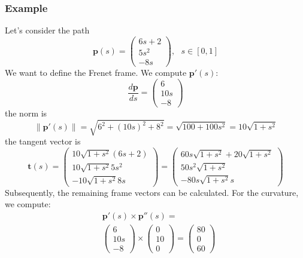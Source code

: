 \documentclass[10pt, letterpaper]{report}
\begin{document}
\subsubsection{Example}
Let's consider the path \begin{equation}
    \mathbf p(s)=\begin{pmatrix}
        6s+2\\5s^2\\-8s 
    \end{pmatrix}, \ \ \ s\in [0,1]
\end{equation}
We want to define the Frenet frame. We compute $\mathbf p'(s)$:\begin{equation}
    \frac{d\mathbf p}{ds}=\begin{pmatrix}
        6\\10s\\-8 
    \end{pmatrix}
\end{equation}
the norm is\begin{equation}
    \|\mathbf p'(s)\|=\sqrt{6^2+(10s)^2+8^2}=\sqrt{100+100s^2}=10\sqrt{1+s^2}
\end{equation}
the tangent vector is \begin{equation}
    \mathbf t(s)=\begin{pmatrix}
        10\sqrt{1+s^2}(6s+2)\\10\sqrt{1+s^2}5s^2\\-10\sqrt{1+s^2}8s 
    \end{pmatrix}=\begin{pmatrix}
        60s\sqrt{1+s^2}+20\sqrt{1+s^2}\\50s^2\sqrt{1+s^2}\\-80s\sqrt{1+s^2}s
    \end{pmatrix}
\end{equation}
Subsequently, the remaining frame vectors can be calculated. For the curvature, we compute:\begin{align}
    &\mathbf p'(s)\times \mathbf p''(s)=\\ 
    &\begin{pmatrix}
        6\\10s\\-8 
    \end{pmatrix}\times \begin{pmatrix}
        0\\10\\0
    \end{pmatrix}=\begin{pmatrix}
        80\\0\\60
    \end{pmatrix}
\end{align}
\end{document}
